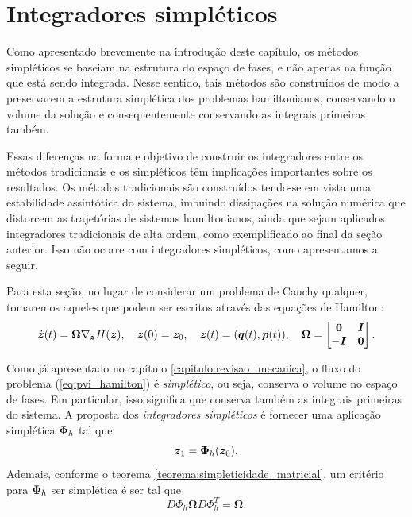 
\section{Integradores simpléticos}\label{secao:integradores_simpleticos}
Como apresentado brevemente na introdução deste capítulo, os métodos simpléticos se baseiam na estrutura do espaço de fases, e não apenas na função que está sendo integrada. Nesse sentido, tais métodos são construídos de modo a preservarem a estrutura simplética dos problemas hamiltonianos, conservando o volume da solução e consequentemente conservando as integrais primeiras também.

Essas diferenças na forma e objetivo de construir os integradores entre os métodos tradicionais e os simpléticos têm implicações importantes sobre os resultados. Os métodos tradicionais são construídos tendo-se em vista uma estabilidade assintótica do sistema, imbuindo dissipações na solução numérica que distorcem as trajetórias de sistemas hamiltonianos, ainda que sejam aplicados integradores tradicionais de alta ordem, como exemplificado ao final da seção anterior. Isso não ocorre com integradores simpléticos, como apresentamos a seguir.

Para esta seção, no lugar de considerar um problema de Cauchy qualquer, tomaremos aqueles que podem ser escritos através das equações de Hamilton:
\begin{equation}\label{eq:pvi_hamilton}
    \dot {\bm z}(t) = \bm \Omega \nabla_{\bm z} H(\bm z),
    \quad
    \bm z(0) = \bm z_0,
    \quad
    \bm z(t) = (\bm q(t), \bm p(t)),
    \quad
    \bm \Omega = \begin{bmatrix}
        \bm 0 & \bm I \\ - \bm I & \bm 0
    \end{bmatrix}.
\end{equation}

Como já apresentado no capítulo \ref{capitulo:revisao_mecanica}, o fluxo do problema (\ref{eq:pvi_hamilton}) é \textit{simplético}, ou seja, conserva o volume no espaço de fases. Em particular, isso significa que conserva também as integrais primeiras do sistema. A proposta dos \textit{integradores simpléticos} é fornecer uma aplicação simplética $\bm \Phi_h$ tal que
\begin{equation*}
    \bm z_1 = \bm \Phi_h(\bm z_0).
\end{equation*}
Ademais, conforme o teorema \ref{teorema:simpleticidade_matricial}, um critério para $\bm \Phi_h$ ser simplética é ser tal que
\begin{equation*}
    D \Phi_h \bm \Omega D \Phi_h^T = \bm \Omega.
\end{equation*}


